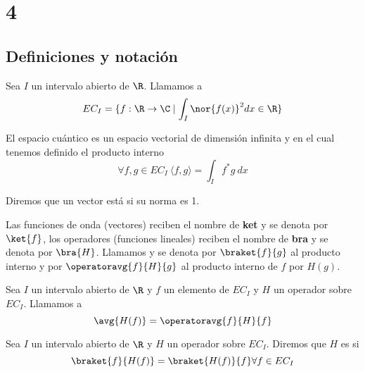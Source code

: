 \chapter{4}\label{ch:4}
\section{Definiciones y notación}
\begin{definicion}
    Sea $I$ un intervalo abierto de $\R$. Llamamos  a
    \begin{equation}
        EC_I=\{f:\R\rightarrow\C\mid\int_I\nor{f(x)}^2 dx \in \R\}
    \end{equation}
\end{definicion}

El espacio cuántico es un espacio vectorial de dimensión infinita y en el cual tenemos definido el producto interno
\begin{equation}
    \forall f,g\in EC_I \ \langle f,g \rangle=\int_I f^* g\ dx
\end{equation}

\begin{definicion}
    Diremos que un vector está  si su norma es 1.
\end{definicion}

Las funciones de onda (vectores) reciben el nombre de \textbf{ket} y se denota por $\ket{f}$, los operadores (funciones lineales) reciben el nombre de \textbf{bra} y se denota por $\bra{H}$. Llamamos  y se denota por $\braket{f}{g}$ al producto interno y por $\operatoravg{f}{H}{g}$ al producto interno de $f$ por $H(g)$.

\begin{definicion}
    Sea $I$ un intervalo abierto de $\R$ y $f$ un elemento de $EC_I$ y $H$ un operador sobre $EC_I$. Llamamos  a
    \begin{equation}
        \avg{H(f)}=\operatoravg{f}{H}{f}
    \end{equation}
\end{definicion}


\begin{definicion}
    Sea $I$ un intervalo abierto de $\R$ y $H$ un operador sobre $EC_I$. Diremos que $H$ es  si
    \begin{equation}
        \braket{f}{H(f)}=\braket{H(f)}{f}\forall f\in EC_I
    \end{equation}
\end{definicion}